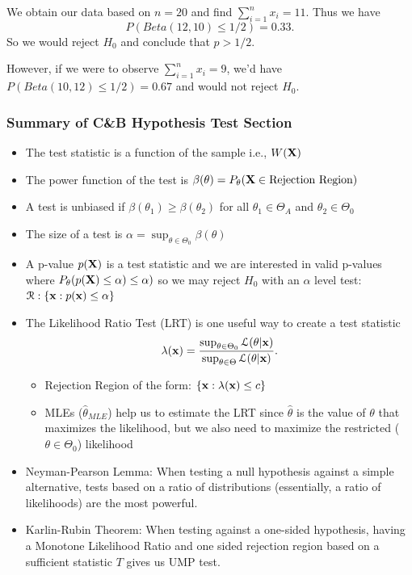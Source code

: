 \documentclass[11pt,]{article}
\def\bx{{\bf x}}
\def\bX{{\bf X}}
\def\thetahat{{\widehat\theta}}
\def\Lsc{{\cal L}}
\def\Rsc{{\cal R}}
\def\sumin{\sum_{i=1}^n}
\begin{document}
We obtain our data based on \(n=20\) and find \(\sumin x_i = 11\). Thus
we have \[P(Beta(12,10)\leq 1/2) = 0.33.\] So we would reject \(H_0\)
and conclude that \(p>1/2\).

However, if we were to observe \(\sumin x_i = 9\), we'd have
\(P(Beta(10,12)\leq 1/2) = 0.67\) and would not reject \(H_0\).

\newpage

\hypertarget{summary-of-cb-hypothesis-test-section}{%
\subsubsection{Summary of C\&B Hypothesis Test
Section}\label{summary-of-cb-hypothesis-test-section}}

\begin{itemize}
\item The test statistic is a function of the sample i.e., $W(\bX)$
\item The power function of the test is $\beta(\theta) = P_\theta(\bX \in \mbox{Rejection Region})$
\item A test is unbiased if $\beta(\theta_1) \geq \beta(\theta_2)$ for all $\theta_1 \in \Theta_A$ and $\theta_2 \in \Theta_0$
\item The size of a test is $\alpha = \sup_{\theta \in \Theta_0} \beta(\theta)$
\item A p-value $p(\bX)$ is a test statistic and we are interested in valid p-values where $P_\theta(p(\bX) \leq \alpha) \leq \alpha)$ so we may reject $H_0$ with an $\alpha$ level test: $\Rsc: \{\bx: p(\bx) \leq \alpha\}$
\item The Likelihood Ratio Test (LRT) is one useful way to create a test statistic
 $$\lambda(\bx) = \frac{\sup_{\theta \in\Theta_0} \Lsc(\theta | \bx)}{\sup_{\theta \in \Theta} \Lsc(\theta | \bx)}.$$
    \begin{itemize} 
    \item Rejection Region of the form: $\{\bx: \lambda(\bx) \leq c\}$
    \item MLEs ($\thetahat_{MLE}$) help us to estimate the LRT since $\thetahat$ is the value of $\theta$ that maximizes the likelihood, but we also need to maximize the restricted ($\theta \in \Theta_0$) likelihood
    \end{itemize}
\item Neyman-Pearson Lemma: When testing a null hypothesis against a simple alternative, tests based on a ratio of distributions (essentially, a ratio of likelihoods) are the most powerful.
\item Karlin-Rubin Theorem: When testing against a one-sided hypothesis, having a Monotone Likelihood Ratio and one sided rejection region based on a sufficient statistic $T$ gives us UMP test.

\end{itemize}
\end{document}
